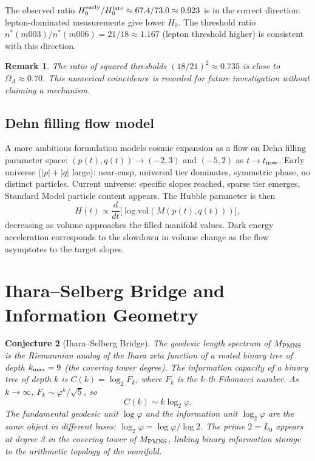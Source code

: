 \documentclass[12pt]{article}
\newtheorem{conjecture}{Conjecture}
\newtheorem{remark}[conjecture]{Remark}
\newcommand{\ph}{\varphi}
\begin{document}
The observed ratio $H_0^{\rm early}/H_0^{\rm late}
\approx 67.4/73.0 \approx 0.923$ is in the correct direction:
lepton-dominated measurements give lower $H_0$. The
threshold ratio $n^*(m003)/n^*(m006) = 21/18 \approx 1.167$
(lepton threshold higher) is consistent with this direction.

\begin{remark}
The ratio of squared thresholds $(18/21)^2 \approx 0.735$ is
close to $\Omega_\Lambda \approx 0.70$. This numerical coincidence
is recorded for future investigation without claiming a mechanism.
\end{remark}

\subsection{Dehn filling flow model}

A more ambitious formulation models cosmic expansion as a flow
on Dehn filling parameter space:
$(p(t), q(t)) \to (-2,3)$ and $(-5,2)$ as $t \to t_{\rm now}$.
Early universe ($|p|+|q|$ large): near-cusp, universal tier
dominates, symmetric phase, no distinct particles.
Current universe: specific slopes reached, sparse tier emerges,
Standard Model particle content appears. The Hubble parameter
is then
\[
  H(t) \propto \frac{d}{dt}\bigl[\log\mathrm{vol}(M(p(t),q(t)))\bigr],
\]
decreasing as volume approaches the filled manifold values.
Dark energy acceleration corresponds to the slowdown in volume
change as the flow asymptotes to the target slopes.

\section{Ihara--Selberg Bridge and Information Geometry}
\label{sec:ihara}

\begin{conjecture}[Ihara--Selberg Bridge]
\label{conj:ihara}
The geodesic length spectrum of $M_{\rm PMNS}$ is the Riemannian
analog of the Ihara zeta function of a rooted binary tree of
depth $k_{\rm max} = 9$ (the covering tower degree). The
information capacity of a binary tree of depth $k$ is
$C(k) = \log_2 F_k$, where $F_k$ is the $k$-th Fibonacci number.
As $k\to\infty$, $F_k \sim \ph^k/\sqrt{5}$, so
\[
  C(k) \sim k\log_2\ph.
\]
The fundamental geodesic unit $\log\ph$ and the information unit
$\log_2\ph$ are the same object in different bases:
$\log_2\ph = \log\ph / \log 2$.
The prime $2 = L_0$ appears at degree 3 in the covering tower
of $M_{\rm PMNS}$, linking binary information storage to the
arithmetic topology of the manifold.
\end{conjecture}
\end{document}

